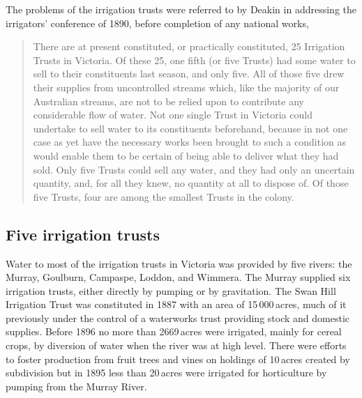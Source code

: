 The problems of the irrigation trusts were referred to by Deakin
 in
addressing the irrigators' conference of 1890, before completion of
any national works,
\begin{quote}
	There are at present constituted, or practically constituted,
	25 Irrigation Trusts in Victoria.  Of these 25, one fifth (or
	five Trusts) had some water to sell to their constituents last
	season, and only five.  All of those five drew their supplies
	from uncontrolled streams which, like the majority of our
	Australian streams, are not to be relied upon to contribute
	any considerable flow of water. Not one single Trust in
	Victoria could undertake to sell water to its constituents
	beforehand, because in not one case as yet have the necessary
	works been brought to such a condition as would enable them to
	be certain of being able to deliver what they had sold. Only
	five Trusts could sell any water, and they had only an
	uncertain quantity, and, for all they knew, no quantity at all
	to dispose of.  Of those five Trusts, four are among the
	smallest Trusts in the colony.
\end{quote}

\subsection*{Five irrigation trusts}

Water to most of the irrigation trusts in Victoria was provided by
five rivers: the Murray, Goulburn, Campaspe, Loddon, and Wimmera.  The
Murray supplied six irrigation trusts, either directly by pumping or
by gravitation.  The Swan Hill Irrigation Trust
 was constituted in
1887 with an area of 15\,000\,acres, much of it previously under the
control of a waterworks trust providing stock and domestic supplies.
Before 1896 no more than 2669\,acres were irrigated, main\-ly for
cereal crops, by diversion of water when the river was at high
level. There were efforts to foster production from fruit trees and
vines on holdings of 10\,acres created by subdivision but in 1895 less
than 20\,acres were irrigated for horticulture by pumping from the
Murray River.\fn{VicPP no.\,20 of 1896, RC~Water Supply, Rept.}

